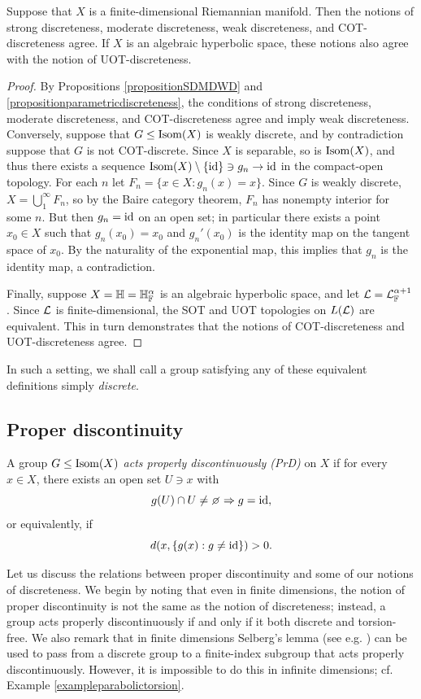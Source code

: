 \begin{proposition}\label{propositionfinitedimequivalent}
Suppose that $X$ is a finite-dimensional Riemannian manifold. Then the notions of strong discreteness, moderate discreteness, weak discreteness, and COT-discreteness agree. If $X$ is an algebraic hyperbolic space, these notions also agree with the notion of UOT-discreteness.
\end{proposition}
\begin{proof}
By Propositions \ref{propositionSDMDWD} and \ref{propositionparametricdiscreteness}, the conditions of strong discreteness, moderate discreteness, and COT-discreteness agree and imply weak discreteness. Conversely, suppose that $G\leq\operatorname{Isom}(X)$ is weakly discrete, and by contradiction suppose that $G$ is not COT-discrete. Since $X$ is separable, so is $\operatorname{Isom}(X)$, and thus there exists a sequence $\operatorname{Isom}(X)\setminus\{\mathrm{id}\}\ni g_n\to\mathrm{id}$ in the compact-open topology. For each $n$ let $F_n = \{x\in X : g_n(x) = x\}$. Since $G$ is weakly discrete, $X = \bigcup_1^\infty F_n$, so by the Baire category theorem, $F_n$ has nonempty interior for some $n$. But then $g_n = \mathrm{id}$ on an open set; in particular there exists a point $x_0\in X$ such that $g_n(x_0) = x_0$ and $g_n'(x_0)$ is the identity map on the tangent space of $x_0$. By the naturality of the exponential map, this implies that $g_n$ is the identity map, a contradiction.

Finally, suppose $X = \H = \H_\F^\alpha$ is an algebraic hyperbolic space, and let $\LL = \LL_\F^{\alpha + 1}$. Since $\mathcal L$ is finite-dimensional, the SOT and UOT topologies on $L(\mathcal L)$ are equivalent. This in turn  demonstrates that the notions of COT-discreteness and UOT-discreteness agree.
\end{proof}
In such a setting, we shall call a group satisfying any of these equivalent definitions simply \emph{discrete}.

\subsection{Proper discontinuity}
\begin{definition}
\label{definitionproperdiscontinuity}
A group $G\leq\operatorname{Isom}(X)$ \emph{acts properly discontinuously (PrD)} on $X$ if for every $x\in X$, there exists an open set $U \ni x$ with 
\[
g(U) \cap U \neq \emptyset \Rightarrow g = \id,
\]
or equivalently, if
\[
d(x,\{g(x):g\neq\mathrm{id}\}) > 0.
\]
\end{definition}

Let us discuss the relations between proper discontinuity and some of our notions of discreteness. We begin by noting that even in finite dimensions, the notion of proper discontinuity is not the same as the notion of discreteness; instead, a group acts properly discontinuously if and only if it both discrete and torsion-free. We also remark that in finite dimensions Selberg's lemma (see e.g. \cite{Alperin}) can be used to pass from a discrete group to a finite-index subgroup that acts properly discontinuously. However, it is impossible to do this in infinite dimensions; cf. Example \ref{exampleparabolictorsion}.

